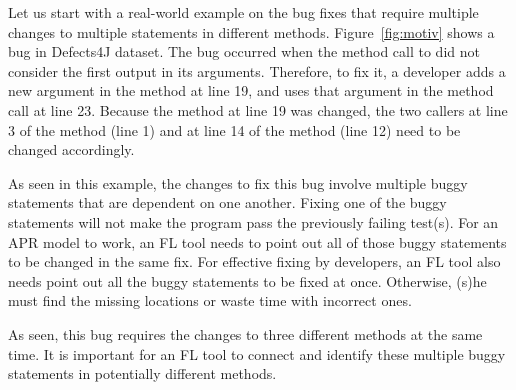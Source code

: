 Let us start with a real-world example on the bug fixes that
require multiple changes to multiple statements in different methods.
Figure~\ref{fig:motiv} shows a bug in Defects4J dataset. The bug
occurred when the method call to  did not
consider the first output in its arguments. Therefore, to fix it, a
developer adds a new argument in the method  at line
19, and uses that argument in the method call  at line 23. Because the method  at
line 19 was changed, the two callers at line 3 of the method
 (line 1) and at line 14 of the method 
(line 12) need to be changed accordingly.



 As seen in
this example, the changes to fix this bug involve multiple buggy
statements that are dependent on one another. Fixing one of the buggy
statements will not make the program pass the previously failing
test(s). For an APR model to work, an FL tool needs to point out all
of those buggy statements to be changed in the same fix. For effective
fixing by developers, an FL tool also needs point out all the buggy
statements to be fixed at once. Otherwise, (s)he must find
the missing locations or waste time with incorrect ones.

 As seen, this
bug requires the changes to three different methods at the same time.
It is important for an FL tool to connect and identify these multiple
buggy statements in potentially different methods.

